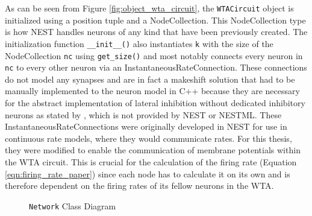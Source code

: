 As can be seen from Figure \ref{fig:object_wta_circuit}, the \texttt{WTACircuit} object is initialized using a position tuple and a NodeCollection. This NodeCollection type is how NEST handles neurons of any kind that have been previously created. The initialization function \texttt{\_\_init\_\_()} also instantiates \texttt{k} with the size of the NodeCollection \texttt{nc} using \texttt{get\_size()} and most notably connects every neuron in \texttt{nc} to every other neuron via an InstantaneousRateConnection. These connections do not model any synapses and are in fact a makeshift solution that had to be manually implemented to the neuron model in C++ because they are necessary for the abstract implementation of lateral inhibition without dedicated inhibitory neurons as stated by \parencite{klampfl_maass_2013}, which is not provided by NEST or NESTML.
These InstantaneousRateConnections were originally developed in NEST for use in continuous rate models, where they would communicate rates. For this thesis, they were modified to enable the communication of membrane potentials within the WTA circuit. This is crucial for the calculation of the firing rate (Equation \ref{eqn:firing_rate_paper}) since each node has to calculate it on its own and is therefore dependent on the firing rates of its fellow neurons in the WTA.
\begin{figure}[htbp]
\centering
{}
\caption{\texttt{Network} Class Diagram} \label{fig:object_network}
\end{figure}
